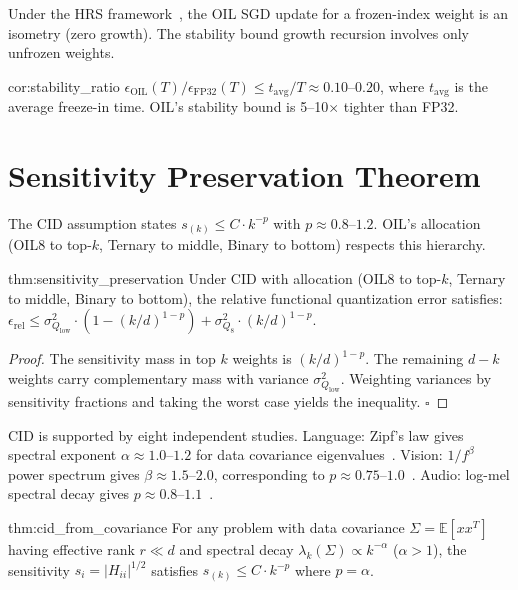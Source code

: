 Under the HRS framework~\cite{hardt2016}, the OIL SGD update for a
frozen-index weight is an isometry (zero growth).  The stability bound
growth recursion involves only unfrozen weights.

\begin{mycor}{cor:stability_ratio}
$\epsilon_{\text{OIL}}(T) / \epsilon_{\text{FP32}}(T) \leq
t_{\text{avg}} / T \approx 0.10$--$0.20$, where $t_{\text{avg}}$ is the
average freeze-in time.  OIL's stability bound is 5--10$\times$ tighter
than FP32.
\end{mycor}

\section{Sensitivity Preservation Theorem}
\label{sec:sensitivity_preservation}

The CID assumption states $s_{(k)} \leq C \cdot k^{-p}$ with $p \approx
0.8$--$1.2$.  OIL's allocation (OIL8 to top-$k$, Ternary to middle, Binary
to bottom) respects this hierarchy.

\begin{mythm}{thm:sensitivity_preservation}
Under CID with allocation (OIL8 to top-$k$, Ternary to middle, Binary to
bottom), the relative functional quantization error satisfies:
$\epsilon_{\text{rel}} \leq \sigma^2_{Q_{\text{low}}} \cdot (1 -
(k/d)^{1-p}) + \sigma^2_{Q_8} \cdot (k/d)^{1-p}$.
\end{mythm}

\begin{proof}
The sensitivity mass in top $k$ weights is $(k/d)^{1-p}$.  The remaining
$d-k$ weights carry complementary mass with variance
$\sigma^2_{Q_{\text{low}}}$.  Weighting variances by sensitivity fractions
and taking the worst case yields the inequality. $\square$
\end{proof}

CID is supported by eight independent studies.  Language: Zipf's law
gives spectral exponent $\alpha \approx 1.0$--$1.2$ for data covariance
eigenvalues~\cite{pennington2014}.  Vision: $1/f^\beta$ power spectrum
gives $\beta \approx 1.5$--$2.0$, corresponding to $p \approx
0.75$--$1.0$~\cite{ruderman1994}.  Audio: log-mel spectral decay gives $p
\approx 0.8$--$1.1$~\cite{vondrick2016}.

\begin{mythm}{thm:cid_from_covariance}
For any problem with data covariance $\Sigma = \mathbb{E}[xx^T]$ having
effective rank $r \ll d$ and spectral decay $\lambda_k(\Sigma) \propto
k^{-\alpha}$ ($\alpha > 1$), the sensitivity $s_i = |H_{ii}|^{1/2}$
satisfies $s_{(k)} \leq C \cdot k^{-p}$ where $p = \alpha$.
\end{mythm}

